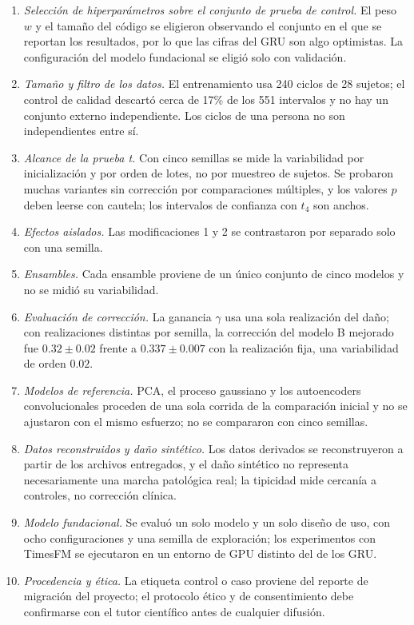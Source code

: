 \documentclass[11pt,a4paper]{article}
\begin{document}
\begin{enumerate}
\item \textit{Selección de hiperparámetros sobre el conjunto de prueba de control.} El peso $w$ y el tamaño del código se eligieron observando el conjunto en el que se reportan los resultados, por lo que las cifras del GRU son algo optimistas. La configuración del modelo fundacional se eligió solo con validación.
\item \textit{Tamaño y filtro de los datos.} El entrenamiento usa 240 ciclos de 28 sujetos; el control de calidad descartó cerca de 17\% de los 551 intervalos y no hay un conjunto externo independiente. Los ciclos de una persona no son independientes entre sí.
\item \textit{Alcance de la prueba t.} Con cinco semillas se mide la variabilidad por inicialización y por orden de lotes, no por muestreo de sujetos. Se probaron muchas variantes sin corrección por comparaciones múltiples, y los valores $p$ deben leerse con cautela; los intervalos de confianza con $t_4$ son anchos.
\item \textit{Efectos aislados.} Las modificaciones 1 y 2 se contrastaron por separado solo con una semilla.
\item \textit{Ensambles.} Cada ensamble proviene de un único conjunto de cinco modelos y no se midió su variabilidad.
\item \textit{Evaluación de corrección.} La ganancia $\gamma$ usa una sola realización del daño; con realizaciones distintas por semilla, la corrección del modelo B mejorado fue $0.32\pm0.02$ frente a $0.337\pm0.007$ con la realización fija, una variabilidad de orden $0.02$.
\item \textit{Modelos de referencia.} PCA, el proceso gaussiano y los autoencoders convolucionales proceden de una sola corrida de la comparación inicial y no se ajustaron con el mismo esfuerzo; no se compararon con cinco semillas.
\item \textit{Datos reconstruidos y daño sintético.} Los datos derivados se reconstruyeron a partir de los archivos entregados, y el daño sintético no representa necesariamente una marcha patológica real; la tipicidad mide cercanía a controles, no corrección clínica.
\item \textit{Modelo fundacional.} Se evaluó un solo modelo y un solo diseño de uso, con ocho configuraciones y una semilla de exploración; los experimentos con TimesFM se ejecutaron en un entorno de GPU distinto del de los GRU.
\item \textit{Procedencia y ética.} La etiqueta control o caso proviene del reporte de migración del proyecto; el protocolo ético y de consentimiento debe confirmarse con el tutor científico antes de cualquier difusión.
\end{enumerate}
\end{document}
